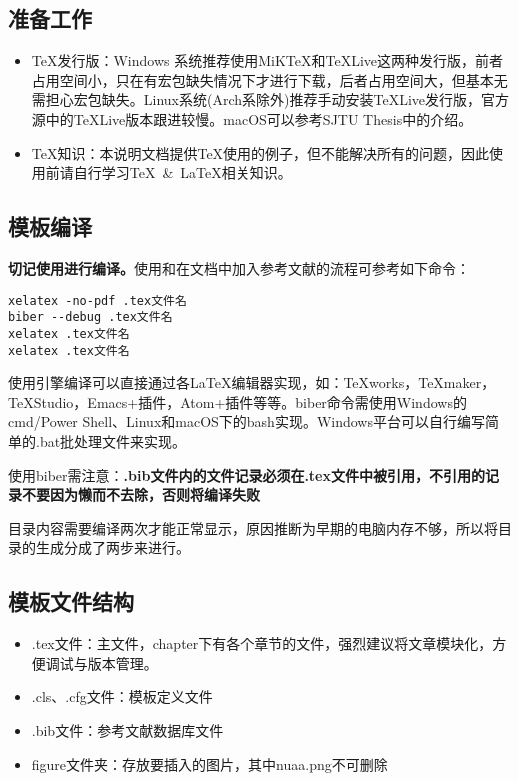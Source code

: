\subsection{准备工作}
\begin{itemize}
  \item \TeX 发行版：Windows 系统推荐使用MiKTeX和\TeX Live这两种发行版，前者占用空间小，只在有宏包缺失情况下才进行下载，后者占用空间大，但基本无需担心宏包缺失。Linux系统(Arch系除外)推荐手动安装\TeX Live发行版，官方源中的TeXLive版本跟进较慢。macOS可以参考SJTU Thesis中的介绍。
  \item \TeX 知识：本说明文档提供\TeX 使用的例子，但不能解决所有的问题，因此使用前请自行学习\TeX~\&~\LaTeX 相关知识。
\end{itemize}

\subsection{模板编译}

\textbf{切记使用\XeLaTeX 进行编译。}使用\XeLaTeX 和在文档中加入参考文献的流程可参考如下命令：

\begin{lstlisting}[basicstyle=\small\ttfamily, caption=手动逐次编译, numbers=none]
xelatex -no-pdf .tex文件名
biber --debug .tex文件名
xelatex .tex文件名
xelatex .tex文件名
\end{lstlisting}

使用\XeLaTeX 引擎编译可以直接通过各\LaTeX 编辑器实现，如：TeXworks，TeXmaker，TeXStudio，Emacs+插件，Atom+插件等等。biber命令需使用Windows的cmd/Power Shell、Linux和macOS下的bash实现。Windows平台可以自行编写简单的.bat批处理文件来实现。

使用biber需注意：\textbf{.bib文件内的文件记录必须在.tex文件中被引用，不引用的记录不要因为懒而不去除，否则将编译失败}

目录内容需要编译两次才能正常显示，原因推断为早期的电脑内存不够，所以将目录的生成分成了两步来进行。

\subsection{模板文件结构}
\begin{itemize}[noitemsep,topsep=0pt,parsep=0pt,partopsep=0pt]
  \item .tex文件：主文件，chapter下有各个章节的文件，强烈建议将文章模块化，方便调试与版本管理。
  \item .cls、.cfg文件：模板定义文件
  \item .bib文件：参考文献数据库文件
  \item figure文件夹：存放要插入的图片，其中nuaa.png不可删除
\end{itemize}
